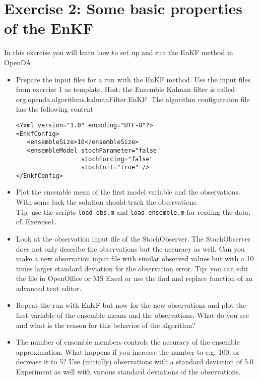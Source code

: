 \documentclass[a4paper,10pt]{article}
\begin{document}
\section{Exercise 2: Some basic properties of the EnKF}

In this exercise you will learn how to set up and run the EnKF method in OpenDA.

\begin{itemize}
  \item Prepare the input files for a run with the EnKF method. Use the input
        files from exercise 1 as template. Hint: the Ensemble Kalman filter
        is called org.openda.algorithms.kalmanFilter.EnKF. The algorithm
        configuration file has the following content
{\footnotesize
\begin{verbatim}
<?xml version="1.0" encoding="UTF-8"?>
<EnkfConfig>
   <ensembleSize>10</ensembleSize>
   <ensembleModel stochParameter="false"
                  stochForcing="false"
                  stochInit="true" />
</EnkfConfig>
\end{verbatim}
}
  \item Plot the ensemble mean of the first model variable and the observations.
        With some luck the solution should track the observations.\\
        Tip: use the scripts {\tt load\_obs.m} and {\tt load\_ensemble.m} for reading the
        data, cf. Exercise1.
 \item Look at the observation input file of the StochObserver. The
       StochObserver does not only describe the observations but the accuracy
       as well. Can you make a new observation input file with similar
       observed values but with a 10 times larger standard deviation for the
       observation error.
       Tip: you can edit the file in OpenOffice or MS Excel or use the find
       and replace function of an advanced text editor.
 \item Repeat the run with EnKF but now for the new observations and plot
       the first variable of the ensemble means and the observations. What do
       you see and what is the reason for this behavior of the algorithm?
 \item The number of ensemble members controls the accuracy of the ensemble
       approximation. What happens if you increase the number to e.g. 100, or
       decrease it to 5? Use (initially) observations with a standard deviation
       of 5.0. Experiment as well with various standard
       deviations of the observations.
\end{itemize}
\end{document}
